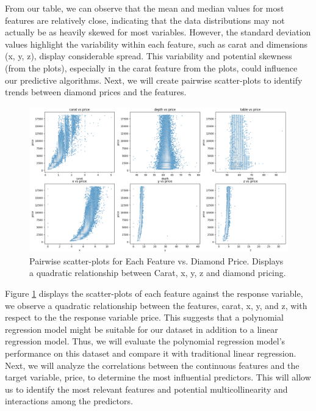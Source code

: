 \documentclass[conference]{IEEEtran}
\begin{document}
From our table, we can observe that the mean and median values for most features are relatively close, indicating that the data distributions may not actually be as heavily skewed for most variables. However, the standard deviation values highlight the variability within each feature, such as carat and dimensions (x, y, z), display considerable spread. This variability and potential skewness (from the plots), especially in the carat feature from the plots, could influence our predictive algorithms. Next, we will create pairwise scatter-plots to identify trends between diamond prices and the features.

\begin{figure}[H]
    \centering
    \includegraphics[width=0.61\linewidth]{scatter.png} 
    \caption{Pairwise scatter-plots for Each Feature vs. Diamond Price. Displays a quadratic relationship between Carat, x, y, z and diamond pricing.}
    \label{fig:scatter}
\end{figure}

Figure \ref{fig:scatter} displays the scatter-plots of each feature against the response variable, we observe a quadratic relationship between the features, carat, x, y, and z, with respect to the the response variable price. This suggests that a polynomial regression model might be suitable for our dataset in addition to a linear regression model. Thus, we will evaluate the polynomial regression model's performance on this dataset and compare it with traditional linear regression. Next, we will analyze the correlations between the continuous features and the target variable, price, to determine the most influential predictors. This will allow us to identify the most relevant features and potential multicollinearity and interactions among the predictors.
\end{document}
